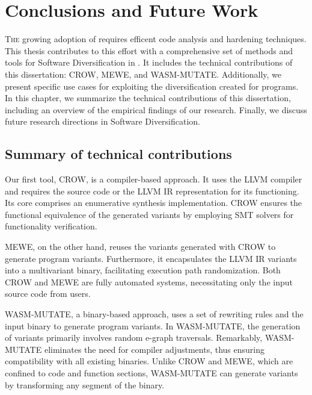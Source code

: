 
\chapter{Conclusions and Future Work}
\label{results}


\lettrine[lines=3]{T}{he} growing adoption of \Wasm requires efficent code analysis and hardening techniques.
This thesis contributes to this effort with a comprehensive set of methods and tools for Software Diversification in \Wasm.
It includes the technical contributions of this dissertation: CROW, MEWE, and WASM-MUTATE.
Additionally, we present specific use cases for exploiting the diversification created for \Wasm programs.
In this chapter, we summarize the technical contributions of this dissertation, including an overview of the empirical findings of our research.
Finally, we discuss future research directions in \Wasm Software Diversification.

\section{Summary of technical contributions}
Our first tool, CROW, is a compiler-based approach.
It uses the LLVM compiler and requires the source code or the LLVM IR representation for its functioning. 
Its core comprises an enumerative synthesis implementation. 
CROW ensures the functional equivalence of the generated variants by employing SMT solvers for functionality verification.  

MEWE, on the other hand, reuses the variants generated with CROW to generate program variants. 
Furthermore, it encapsulates the LLVM IR variants into a \Wasm multivariant binary, facilitating execution path randomization. 
Both CROW and MEWE are fully automated systems, necessitating only the input source code from users. 

WASM-MUTATE, a binary-based approach, uses a set of rewriting rules and the input \wasm binary to generate program variants. 
In WASM-MUTATE, the generation of \Wasm variants primarily involves random e-graph traversals. 
Remarkably, WASM-MUTATE eliminates the need for compiler adjustments, thus ensuring compatibility with all existing \Wasm binaries. 
Unlike CROW and MEWE, which are confined to code and function sections, WASM-MUTATE can generate variants by transforming any segment of the \wasm binary.

